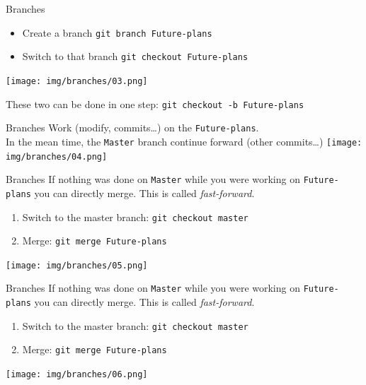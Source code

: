 \documentclass[usenames,dvipsnames,9pt]{beamer}
\begin{document}
%
\begin{frame}{Branches}
  \begin{itemize}
    \item Create a branch \lstinline|git branch Future-plans|
    \item Switch to that branch \lstinline|git checkout Future-plans|
  \end{itemize}
  \vspace{-1cm}
  \texttt{[image: img/branches/03.png]}
  \vspace{-1cm}

  These two can be done in one step: \lstinline|git checkout -b Future-plans|
\end{frame}

%
\begin{frame}{Branches}
  Work (modify, commits\ldots) on the \texttt{Future-plans}.\\
  In the mean time, the \texttt{Master} branch continue forward (other commits\ldots)
  \texttt{[image: img/branches/04.png]}
\end{frame}

%
\begin{frame}{Branches}
  If nothing was done on \texttt{Master} while you were working on \texttt{Future-plans} you can directly merge. This is called \emph{fast-forward}.
  \begin{enumerate}
    \item Switch to the master branch: \lstinline|git checkout master|
    \item Merge: \lstinline|git merge Future-plans|
  \end{enumerate}
  \vspace{-1cm}
  \texttt{[image: img/branches/05.png]}
\end{frame}

%
\begin{frame}{Branches}
  \vspace{0.2cm}
  If nothing was done on \texttt{Master} while you were working on \texttt{Future-plans} you can directly merge. This is called \emph{fast-forward}.
  \begin{enumerate}
    \item Switch to the master branch: \lstinline|git checkout master|
    \item Merge: \lstinline|git merge Future-plans|
  \end{enumerate}
  \vspace{-0.8cm}
  \hspace{0.07cm}\texttt{[image: img/branches/06.png]}
\end{frame}
\end{document}
